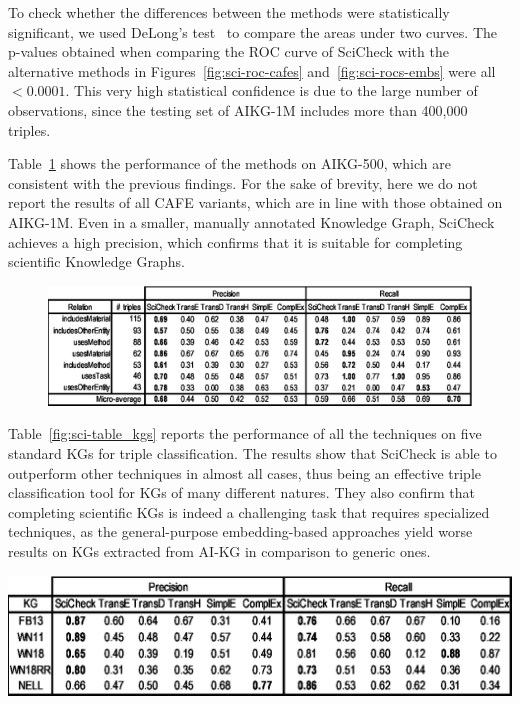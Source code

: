 To check whether the differences between the methods were statistically significant, we used DeLong's test~\cite{delong1988} to compare the areas under two curves. The p-values obtained when comparing the ROC  curve of SciCheck with the alternative methods in Figures~\ref{fig:sci-roc-cafes} and~\ref{fig:sci-rocs-embs} were all~$<0.0001$. This very high statistical confidence is due to the large number of observations, since the testing set of AIKG-1M includes more than 400,000 triples.

Table~\ref{fig:sci-table_sw} shows the performance of the methods on AIKG-500, which are consistent with the previous findings. For the sake of brevity, here we do not report the results of all CAFE variants, which are in line with those obtained on AIKG-1M. Even in a smaller, manually annotated Knowledge Graph, SciCheck achieves a high precision, which confirms that it is suitable for completing scientific Knowledge Graphs. 

\begin{figure}[!htp]
    \centering
    \includegraphics[width=\textwidth]{fig/scicheck/table_sw}
    \label{fig:sci-table_sw}
\end{figure}

Table~\ref{fig:sci-table_kgs} reports the performance of all the techniques on five standard KGs for triple classification. The results show that SciCheck is able to outperform other techniques in almost all cases, thus being an effective triple classification tool for KGs of many different natures. They also confirm that completing scientific KGs is indeed a challenging task that requires specialized techniques, as the general-purpose embedding-based approaches yield worse results on KGs extracted from AI-KG in comparison to generic ones.

\begin{table}[!htp]
    \centering
    \includegraphics[width=.85\textwidth]{fig/scicheck/table_kgs}
    \label{fig:sci-table_kgs}
\end{table}

